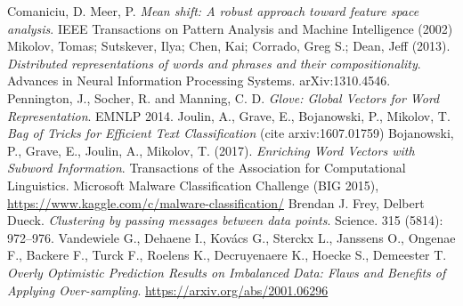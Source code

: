 \documentclass[oneside, twocolumn, a4paper, 10pt]{IEEEtran}
\begin{document}
\begin{thebibliography}{6}
 Comaniciu, D. Meer, P. \textit{Mean shift: A robust approach toward feature space analysis}. IEEE Transactions on Pattern Analysis and Machine Intelligence (2002)
 Mikolov, Tomas; Sutskever, Ilya; Chen, Kai; Corrado, Greg S.; Dean, Jeff (2013). \textit{Distributed representations of words and phrases and their compositionality}. Advances in Neural Information Processing Systems. arXiv:1310.4546.
 Pennington, J., Socher, R. and Manning, C. D. \textit{Glove: Global Vectors for Word Representation}. EMNLP 2014.
 Joulin, A., Grave, E., Bojanowski, P., Mikolov, T. \textit{Bag of Tricks for Efficient Text Classification} (cite arxiv:1607.01759)
 Bojanowski, P., Grave, E., Joulin, A.,  Mikolov, T. (2017). \textit{Enriching Word Vectors with Subword Information}. Transactions of the Association for Computational Linguistics.
 Microsoft Malware Classification Challenge (BIG 2015), \url{https://www.kaggle.com/c/malware-classification/}
 Brendan J. Frey, Delbert Dueck. \textit{Clustering by passing messages between data points}. Science. 315 (5814): 972–976.
 Vandewiele G., Dehaene I., Kovács G., Sterckx L., Janssens O., Ongenae F., Backere F., Turck F., Roelens K., Decruyenaere K., Hoecke S., Demeester T. \textit{Overly Optimistic Prediction Results on Imbalanced Data: Flaws and Benefits of Applying Over-sampling}. \url{https://arxiv.org/abs/2001.06296}
\end{thebibliography}
\end{document}
